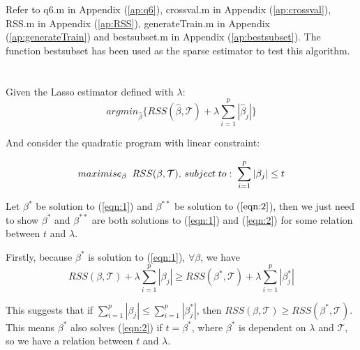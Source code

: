 \documentclass{article}
\newcommand{\hb}{\hat{\beta}}
\begin{document}
	
	\section{}
	Refer to q6.m in Appendix (\ref{ap:q6}), crossval.m in Appendix (\ref{ap:crossval}), RSS.m in Appendix (\ref{ap:RSS}), generateTrain.m in Appendix (\ref{ap:generateTrain}) and bestsubset.m in Appendix (\ref{ap:bestsubset}). The function bestsubset has been used as the sparse estimator to test this algorithm.
	
	\section{}
	Given the Lasso estimator defined with $ \lambda $:
	\begin{equation}
		argmin_{\hb} \{RSS(\hb, \mathcal{T}) + \lambda \sum_{i = 1}^{p} |\hb_j|\}
		\label{eqn:1}
	\end{equation}
	
	And consider the quadratic program with linear constraint:

	\begin{equation}
		maximise_{\beta} \; \; RSS(\beta, \mathcal{T}), \,
		subject \; to: \; \sum_{i = 1}^{p} |\beta_j| \leq t \\
		\label{eqn:2}
	\end{equation}

	Let $ \beta^* $ be solution to (\ref{eqn:1}) and $ \beta^{**} $ be solution to ($ \ref{eqn:2} $), then we just need to show $ \beta^* $ and $ \beta^{**} $ are both solutions to (\ref{eqn:1}) and (\ref{eqn:2}) for some relation between $ t $ and $ \lambda $.
	
	Firstly, because $ \beta^* $ is solution to (\ref{eqn:1}), $ \forall \beta$, we have
	\[RSS(\beta, \mathcal{T}) + \lambda \sum_{i = 1}^{p} |\beta_j| \geq RSS(\beta^*, \mathcal{T}) +  \lambda \sum_{i = 1}^{p} |\beta^*_j|\]
	
	This suggests that if $ \sum_{i = 1}^{p} |\beta_j| \leq \sum_{i = 1}^{p} |\beta^*_j| $, then $ RSS(\beta, \mathcal{T}) \geq RSS(\beta^*, \mathcal{T}) $. This means $ \beta^* $ also solves (\ref{eqn:2}) if $ t = \beta^* $, where $ \beta^* $ is dependent on $ \lambda $ and $ \mathcal{T} $, so we have a relation between $ t $ and $ \lambda $.
	
\end{document}
